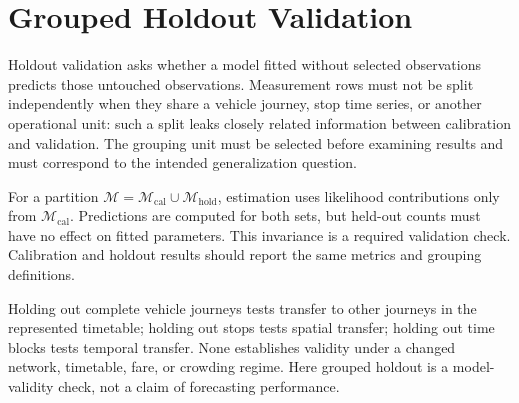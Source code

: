 
\section{Grouped Holdout Validation}
\label{sec:grouped-holdout-validation}

Holdout validation asks whether a model fitted without selected observations
predicts those untouched observations. Measurement rows must not be split
independently when they share a vehicle journey, stop time series, or another
operational unit: such a split leaks closely related information between
calibration and validation. The grouping unit must be selected before examining
results and must correspond to the intended generalization question.

For a partition $\mathcal M=\mathcal M_{\mathrm{cal}}\cup
\mathcal M_{\mathrm{hold}}$, estimation uses likelihood contributions only
from $\mathcal M_{\mathrm{cal}}$. Predictions are computed for both sets, but
held-out counts must have no effect on fitted parameters. This invariance is a
required validation check. Calibration and holdout results should report the
same metrics and grouping definitions.

Holding out complete vehicle journeys tests transfer to other journeys in the
represented timetable; holding out stops tests spatial transfer; holding out
time blocks tests temporal transfer. None establishes validity under a changed
network, timetable, fare, or crowding regime. Here grouped holdout is a model-
validity check, not a claim of forecasting performance.
